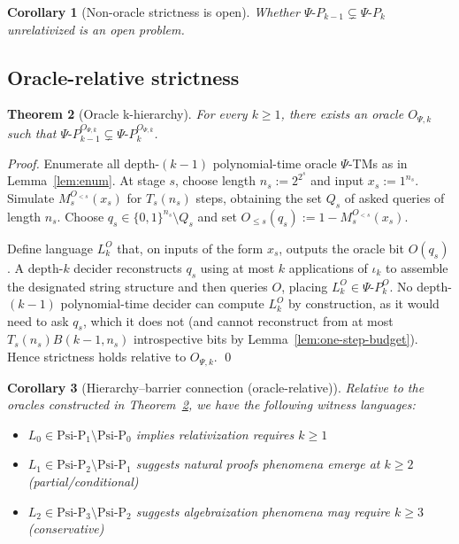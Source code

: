 \documentclass[11pt]{article}
\newtheorem{theorem}{Theorem}[section]
\newtheorem{corollary}[theorem]{Corollary}
\theoremstyle{plain}
\theoremstyle{definition}
\newcommand{\PSi}{\Psi}
\newcommand{\bits}{\{0,1\}}
\begin{document}
\begin{corollary}[Non-oracle strictness is open]
\label{cor:strictness-open}
Whether $\Psi\text{-}P_{k-1}\subsetneq \Psi\text{-}P_k$ unrelativized is an open problem.
\end{corollary}

\subsection{Oracle-relative strictness}
\label{sec:oracle-strictness}

\begin{theorem}[Oracle k-hierarchy]
\label{thm:oracle-k-hierarchy}
For every $k\ge1$, there exists an oracle $O_{\PSi,k}$ such that $\Psi\text{-}P_{k-1}^{O_{\PSi,k}} \subsetneq \Psi\text{-}P_{k}^{O_{\PSi,k}}$.
\end{theorem}
\begin{proof}
Enumerate all depth-$(k{-}1)$ polynomial-time oracle $\PSi$-TMs as in Lemma~\ref{lem:enum}. At stage $s$, choose length $n_s:=2^{2^s}$ and input $x_s:=1^{n_s}$. Simulate $M_s^{O_{<s}}(x_s)$ for $T_s(n_s)$ steps, obtaining the set $Q_s$ of asked queries of length $n_s$. Choose $q_s\in\bits^{n_s}\setminus Q_s$ and set $O_{\le s}(q_s):=1-M_s^{O_{<s}}(x_s)$.

Define language $L_k^{O}$ that, on inputs of the form $x_s$, outputs the oracle bit $O(q_s)$. A depth-$k$ decider reconstructs $q_s$ using at most $k$ applications of $\iota_k$ to assemble the designated string structure and then queries $O$, placing $L_k^{O}\in\Psi\text{-}P_{k}^{O}$. No depth-$(k{-}1)$ polynomial-time decider can compute $L_k^{O}$ by construction, as it would need to ask $q_s$, which it does not (and cannot reconstruct from at most $T_s(n_s) B(k{-}1,n_s)$ introspective bits by Lemma~\ref{lem:one-step-budget}). Hence strictness holds relative to $O_{\PSi,k}$. \qed
\end{proof}

\begin{corollary}[Hierarchy--barrier connection (oracle-relative)]
Relative to the oracles constructed in Theorem~\ref{thm:oracle-k-hierarchy}, we have the following witness languages:
\begin{itemize}
    \item $L_0 \in \text{Psi-P}_1 \setminus \text{Psi-P}_0$ 
          implies relativization requires $k \geq 1$
    \item $L_1 \in \text{Psi-P}_2 \setminus \text{Psi-P}_1$ 
          suggests natural proofs phenomena emerge at $k \geq 2$ (partial/conditional)  
    \item $L_2 \in \text{Psi-P}_3 \setminus \text{Psi-P}_2$ 
          suggests algebraization phenomena may require $k \geq 3$ (conservative)
\end{itemize}
\end{corollary}
\end{document}
